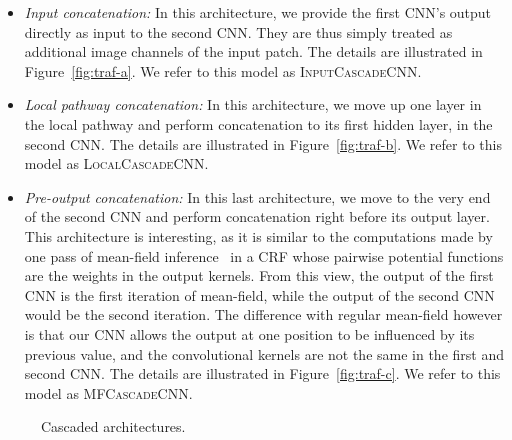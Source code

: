 \documentclass[final,5p,times,twocolumn]{elsarticle}
\begin{document}
\begin{itemize}

\item {\it Input concatenation:} In this architecture, we provide the first CNN's output directly as input to the second CNN. They are thus simply treated as additional image channels of the input patch. The details are illustrated in Figure~\ref{fig:traf-a}. We refer to this model as \textsc{InputCascadeCNN}.

\item {\it Local pathway concatenation:} In this architecture, we move up one layer in the local pathway and perform concatenation to its first hidden layer, in the second CNN. The details are illustrated in Figure~\ref{fig:traf-b}. We refer to this model as  \textsc{LocalCascadeCNN}. 

\item {\it Pre-output concatenation:} In this last architecture, we move to the very end of the second CNN and perform concatenation right before its output layer. This architecture is interesting, as it is similar to the computations made by one pass of mean-field inference~\citep{xing2002} in a CRF whose pairwise potential functions are the weights in the output kernels. From this view, the output of the first CNN is the first iteration of mean-field, while the output of the second CNN would be the second iteration. The difference with regular mean-field however is that our CNN allows the output at one position to be influenced by its previous value, and the convolutional kernels are not the same in the first and second CNN. The details are illustrated in Figure~\ref{fig:traf-c}. We refer to this model as \textsc{MFCascadeCNN}.

\end{itemize}






\begin{figure*}[htp]

\centering

\newline
{}
\newline
{}

\caption{Cascaded architectures.}

\label{fig:traf}

\end{figure*}
\end{document}
